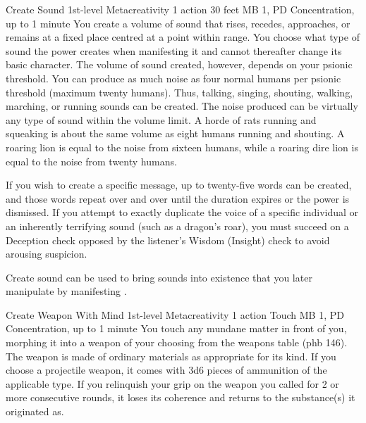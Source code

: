 \DndPowerHeader%
  {Create Sound}
  {1st-level Metacreativity}
  {1 action}
  {30 feet}
  {MB 1, PD \lvlone}
  {Concentration, up to 1 minute}
  You create a volume of sound that rises, recedes, approaches,
  or remains at a fixed place centred at a point within range.
  You choose what type of sound
  the power creates when manifesting it
  and cannot thereafter change its basic character.
  The volume of sound created,
  however, depends on your psionic threshold.
  You can produce as much noise as
  four normal humans per psionic threshold (maximum twenty humans).
  Thus, talking, singing, shouting, walking,
  marching, or running sounds can be created.
  The noise produced can be virtually any type of sound
  within the volume limit.
  A horde of rats running and squeaking
  is about the same volume as eight humans running and shouting.
  A roaring lion is equal to the noise from sixteen humans,
  while a roaring dire lion is equal to the noise from twenty humans.

  If you wish to create a specific message,
  up to twenty-five words can be created,
  and those words repeat over and over
  until the duration expires or the power is dismissed.
  If you attempt to exactly duplicate the voice
  of a specific individual or an inherently terrifying sound
  (such as a dragon's roar),
  you must succeed on a Deception check opposed
  by the listener's Wisdom (Insight) check
  to avoid arousing suspicion.
  
  Create sound can be used to bring sounds into existence
  that you later manipulate by manifesting .

\DndPowerHeader%
  {Create Weapon With Mind}
  {1st-level Metacreativity}
  {1 action}
  {Touch}
  {MB 1, PD \lvlone}
  {Concentration, up to 1 minute}
  You touch any mundane matter in front of you,
  morphing it into a weapon of your choosing
  from the weapons table (phb 146).
  The weapon is made of ordinary materials
  as appropriate for its kind.
  If you choose a projectile weapon,
  it comes with 3d6 pieces of ammunition
  of the applicable type.
  If you relinquish your grip on the weapon you called
  for 2 or more consecutive rounds,
  it loses its coherence and returns to the substance(s)
  it originated as.

